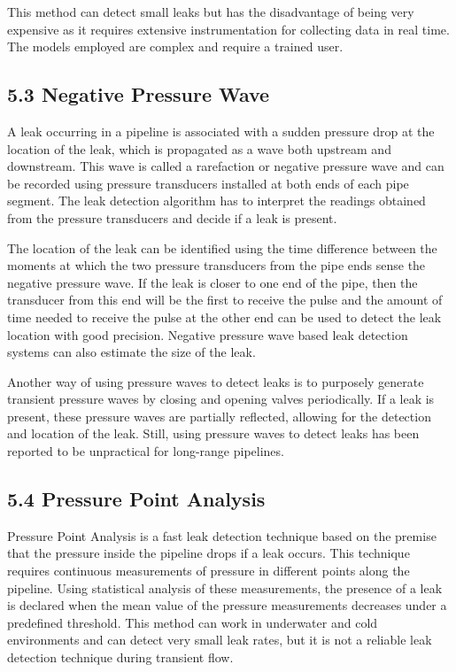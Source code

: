 This method can detect small leaks but has the disadvantage of being very expensive as it requires extensive instrumentation for collecting data in real time. The models employed are complex and require a trained user.

\subsection*{5.3 Negative Pressure Wave}

A leak occurring in a pipeline is associated with a sudden pressure drop at the location of the leak, which is propagated as a wave both upstream and downstream. This wave is called a rarefaction or negative pressure wave and can be recorded using pressure transducers installed at both ends of each pipe segment. The leak detection algorithm has to interpret the readings obtained from the pressure transducers and decide if a leak is present.

The location of the leak can be identified using the time difference between the moments at which the two pressure transducers from the pipe ends sense the negative pressure wave. If the leak is closer to one end of the pipe, then the transducer from this end will be the first to receive the pulse and the amount of time needed to receive the pulse at the other end can be used to detect the leak location with good precision. Negative pressure wave based leak detection systems can also estimate the size of the leak.

Another way of using pressure waves to detect leaks is to purposely generate transient pressure waves by closing and opening valves periodically. If a leak is present, these pressure waves are partially reflected, allowing for the detection and location of the leak. Still, using pressure waves to detect leaks has been reported to be unpractical for long-range pipelines.

\subsection*{5.4 Pressure Point Analysis}

Pressure Point Analysis is a fast leak detection technique based on the premise that the pressure inside the pipeline drops if a leak occurs. This technique requires continuous measurements of pressure in different points along the pipeline. Using statistical analysis of these measurements, the presence of a leak is declared when the mean value of the pressure measurements decreases under a predefined threshold. This method can work in underwater and cold environments and can detect very small leak rates, but it is not a reliable leak detection technique during transient flow.

